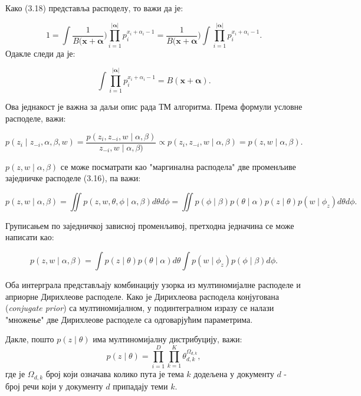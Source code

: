 Како (3.18) представља расподелу, то важи да је:

\begin{equation}
1 = \int \frac{1}{B(\mathbf{x+\alpha}})\prod_{i=1}^{|\mathbf{\alpha}|} p_i^{x_i+\alpha_i-1} = \frac{1}{B(\mathbf{x+\alpha}})\int \prod_{i=1}^{|\mathbf{\alpha}|} p_i^{x_i+\alpha_i-1}.
\end{equation}
Одакле следи да је:

\begin{equation}
\int \prod_{i=1}^{|\mathbf{\alpha}|} p_i^{x_i+\alpha_i-1} = B(\mathbf{x+\alpha}).
\end{equation}

Ова једнакост је важна за даљи опис рада ТМ алгоритма. Према формули условне расподеле, важи:


\begin{equation}
p(z_i \mid z_{-i},\alpha,\beta,w) = \frac{p(z_i,z_{-i},w \mid \alpha,\beta)}{z_{-i},w \mid \alpha,\beta)} \propto p(z_i,z_{-i},w \mid \alpha,\beta) = p(z,w \mid \alpha,\beta).
\end{equation}

$p(z,w \mid \alpha,\beta)$ се може посматрати као "маргинална расподела" две променљиве  заједничке расподеле (3.16), па важи:

\begin{equation}
p(z,w \mid \alpha,\beta) = \iint p(z,w,\theta,\phi \mid \alpha,\beta)d\theta d\phi = \iint p(\phi \mid \beta)p(\theta \mid \alpha)p(z \mid \theta)p(w \mid \phi_z) d\theta d\phi.
\end{equation}

Груписањем по заједничкој зависној променљивој, претходна једначина се може написати као:

\begin{equation}
p(z,w \mid \alpha,\beta) = \int p(z \mid \theta)p(\theta \mid \alpha)d\theta \int p(w \mid \phi_z)p(\phi \mid \beta)d\phi.
\end{equation}

Оба интерграла представљају комбинацију узорка из мултиномијалне расподеле и априорне Дирихлеове расподеле. Како је Дирихлеова расподела конјугована (\textit{conjugate prior}) са мултиномијалном, у подинтегралном изразу се налази "множење" две Дирихлеове расподеле са одговарјућим параметрима.

Дакле, пошто  $p(z \mid \theta)$ има мултиномијалну дистрибуцију, важи:
\begin{equation}
p(z \mid \theta) = \prod_{i=1}^D \prod_{k=1}^K \theta_{d,k}^{\Omega_{d,k}},
\end{equation}
где је $\Omega_{d,k}$ број који означава колико пута је тема $k$ додељена у документу $d$ - број речи који у документу $d$ припадају теми $k$.

